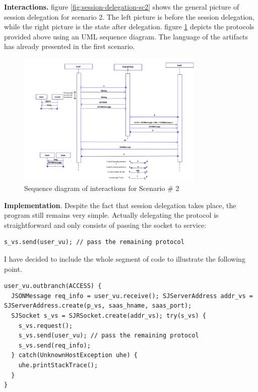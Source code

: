 \textbf{Interactions.} figure \ref{fig:session-delegation-sc2} shows the general picture of session delegation for scenario 2. The left picture is before the session delegation, while the right picture is the state after delegation. figure \ref{fig:seq-diagram-sc2} depicts the protocols provided above using an UML sequence diagram. The language of the artifacts has already presented in the first scenario.

\begin{figure}
\centering
\includegraphics[width=0.8\textwidth]{resources/interaction-sc2.png}
\caption{Sequence diagram of interactions for Scenario \# 2}
\label{fig:seq-diagram-sc2}
\end{figure}

\textbf{Implementation}. Despite the fact that session delegation takes place, the program still remains very simple. Actually delegating the protocol is straightforward and only consists of passing the socket to service:

\begin{lstlisting}
s_vs.send(user_vu); // pass the remaining protocol
\end{lstlisting}

I have decided to include the whole segment of code to illustrate the following point. 

\begin{lstlisting}
user_vu.outbranch(ACCESS) {
  JSONMessage req_info = user_vu.receive(); SJServerAddress addr_vs = SJServerAddress.create(p_vs, saas_hname, saas_port);
  SJSocket s_vs = SJRSocket.create(addr_vs); try(s_vs) {
    s_vs.request();
    s_vs.send(user_vu); // pass the remaining protocol    
    s_vs.send(req_info);
  } catch(UnknownHostException uhe) {
    uhe.printStackTrace(); 
  }
}
\end{lstlisting}

